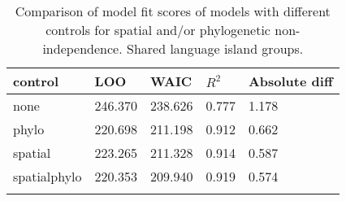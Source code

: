 \begin{longtable}{p{2cm}p{2cm}p{2cm}p{2cm}p{2cm}}
  \toprule
control & LOO & WAIC & $R^2$ & Absolute diff \\ 
  \midrule
none & 246.370 & 238.626 & 0.777 & 1.178 \\ 
  phylo & 220.698 & 211.198 & 0.912 & 0.662 \\ 
  spatial & 223.265 & 211.328 & 0.914 & 0.587 \\ 
  spatialphylo & 220.353 & 209.940 & 0.919 & 0.574 \\ 
   \bottomrule
\caption{Comparison of model fit scores of models with different controls for spatial and/or phylogenetic non-independence. Shared language island groups.} 
\label{model_fit_score_table_medium}
\end{longtable}
